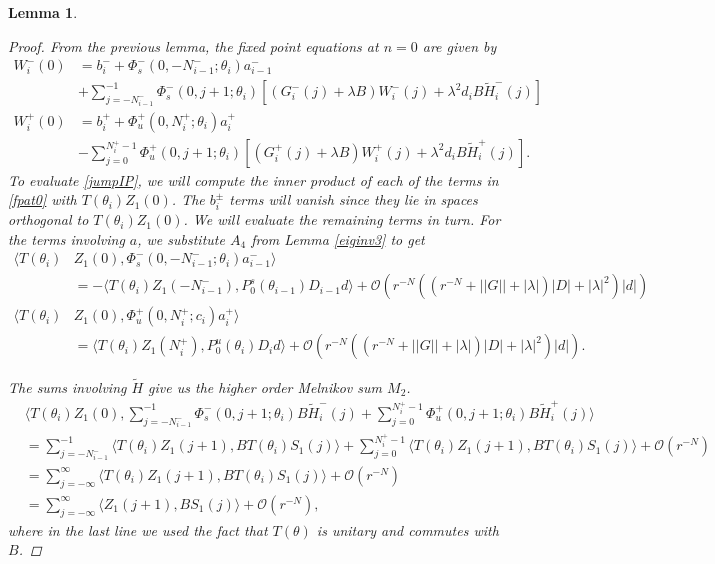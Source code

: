 \documentclass[12pt]{elsarticle}
\newtheorem{lemma}{Lemma}
\begin{document}
\begin{lemma}
\begin{proof}
From the previous lemma, the fixed point equations at $n = 0$ are given by 
\begin{equation}\label{fpat0}
\begin{aligned}
W_i^-(0) &= b_i^- +
\Phi_s^-(0, -N_{i-1}^-; \theta_i) a_{i-1}^- \\
&+ \sum_{j = -N_{i-1}^-}^{-1} \Phi_s^-(0, j+1; \theta_i)
[(G_i^-(j) + \lambda B) W_i^-(j) + \lambda^2 d_i B \tilde{H}_i^-(j)] \\
W_i^+(0) &= b_i^+ + \Phi_u^+(0, N_i^+; \theta_i) a_i^+ \\
&- \sum_{j = 0}^{N_i^+-1} \Phi_u^+(0, j+1; \theta_i) 
[(G_i^+(j) + \lambda B) W_i^+(j) + \lambda^2 d_i B \tilde{H}_i^+(j)].
\end{aligned}
\end{equation}
To evaluate \eqref{jumpIP}, we will compute the inner product of each of the terms in \eqref{fpat0} with $T(\theta_i)Z_1(0)$. The $b_i^\pm$ terms will vanish since they lie in spaces orthogonal to $T(\theta_i) Z_1(0)$. We will evaluate the remaining terms in turn. For the terms involving $a$, we substitute $A_4$ from Lemma \ref{eiginv3} to get
\begin{align*}
\langle T(\theta_i) &Z_1(0), \Phi_s^-(0, -N_{i-1}^-; \theta_i) a_{i-1}^- \rangle \\
&= -\langle T(\theta_i) Z_1(-N_{i-1}^-), P_0^s(\theta_{i-1}) D_{i-1} d \rangle + \mathcal{O}\left(r^{-N}( (r^{-N} + ||G|| + |\lambda|)|D| + |\lambda|^2 )|d| \right) \\
\langle T(\theta_i) &Z_1(0), \Phi_u^+(0, N_i^+; c_i) a_i^+ \rangle \\
&= \langle T(\theta_i) Z_1(N_i^+), P_0^u(\theta_i) D_i d \rangle + \mathcal{O}\left(r^{-N}( (r^{-N} + ||G|| + |\lambda|)|D| + |\lambda|^2 )|d| \right).
\end{align*}

The sums involving $\tilde{H}$ give us the higher order Melnikov sum $M_2$.
\begin{align*}
&\langle T(\theta_i) Z_1(0), \sum_{j = -N_{i-1}^-}^{-1} \Phi_s^-(0, j+1; \theta_i) B \tilde{H}_i^-(j) + \sum_{j = 0}^{N_i^+-1} \Phi_u^+(0, j+1; \theta_i) B \tilde{H}_i^+(j) \rangle \\
&= \sum_{j = -N_{i-1}^-}^{-1} \langle T(\theta_i) Z_1(j+1), B T(\theta_i) S_1(j) \rangle + \sum_{j = 0}^{N_i^+-1} \langle T(\theta_i) Z_1(j+1), B T(\theta_i) S_1(j) \rangle + \mathcal{O}(r^{-N})\\
&= \sum_{j = -\infty}^{\infty} \langle T(\theta_i) Z_1(j+1), B T(\theta_i) S_1(j)\rangle + \mathcal{O}(r^{-N}) \\
&= \sum_{j = -\infty}^{\infty} \langle Z_1(j+1), B S_1(j)\rangle + \mathcal{O}(r^{-N}),
\end{align*}
where in the last line we used the fact that $T(\theta)$ is unitary and commutes with $B$.


\end{proof}
\end{lemma}
\end{document}
